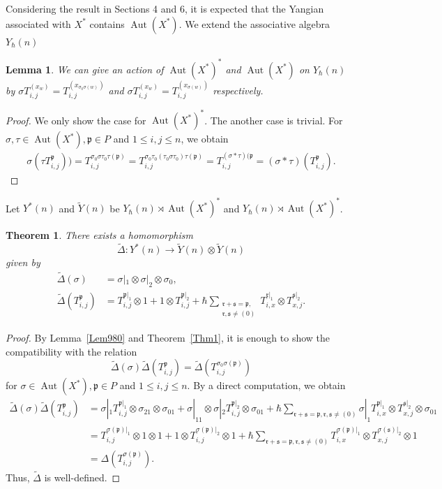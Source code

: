 \documentclass{article}
\newtheorem{Theorem}[equation]{Theorem}
\newtheorem{Lemma}[equation]{Lemma}
\theoremstyle{definition}
\theoremstyle{remark}
\numberwithin{equation}{section}
\DeclareMathOperator{\Aut}{Aut}
\numberwithin{equation}{section}
\begin{document}
Considering the result in Sections 4 and 6, it is expected that the Yangian associated with $X^*$ contains $\Aut(X^*)$. We extend the associative algebra $Y_\hbar(n)$
\begin{Lemma}
We can give an action of $\Aut(X^*)^\ast$ and $\Aut(X^*)$ on $Y_\hbar(n)$ by $\sigma T^{(x_w)}_{i,j}=T^{(x_{\sigma_0\sigma(w)})}_{i,j}$ and $\sigma T^{(x_w)}_{i,j}=T^{(x_{\sigma(w)})}_{i,j}$ respectively.
\end{Lemma}
\begin{proof}
We only show the case for $\Aut(X^*)^\ast$. The another case is trivial. For $\sigma,\tau\in\Aut(X^*),\mathfrak{p}\in P$ and $1\leq i,j\leq n$, we obtain
\begin{align*}
\sigma(\tau T^{\mathfrak{p}}_{i,j}))=T^{\sigma_0\sigma\tau_0\tau(\mathfrak{p})}_{i,j}=T^{\sigma_0\tau_0(\tau_0\sigma\tau_0)\tau(\mathfrak{p})}_{i,j}=T^{(\sigma\ast\tau)(\mathfrak{p}}_{i,j}=(\sigma\ast\tau)(T^{\mathfrak{p}}_{i,j}).
\end{align*}
\end{proof}
Let $Y^\ast(n)$ and $\widetilde{Y}(n)$ be $Y_\hbar(n)\rtimes\Aut(X^*)^*$ and $Y_\hbar(n)\rtimes\Aut(X^*)^\ast$.
\begin{Theorem}
There exists a homomorphism 
\[\widetilde{\Delta}\colon Y^\ast(n)\to \widetilde{Y}(n)\otimes \widetilde{Y}(n)\]
given by
\begin{align*}
\widetilde{\Delta}(\sigma)&=\sigma|_1\otimes\sigma|_2\otimes\sigma_0,\\
\widetilde{\Delta}(T^{\mathfrak{p}}_{i,j})&=T^{\mathfrak{p}|_1}_{i,j}\otimes1+1\otimes T^{\mathfrak{p}|_2}_{i,j}+\hbar\sum_{\substack{\mathfrak{r}+\mathfrak{s}=\mathfrak{p},\\\mathfrak{r},\mathfrak{s}\neq(0)}}T^{\mathfrak{r}|_1}_{i,x}\otimes T^{\mathfrak{s}|_2}_{x,j}.
\end{align*}
\end{Theorem}
\begin{proof}
By Lemma~\ref{Lem980} and Theorem~\ref{Thm1}, it is enough to show the compatibility with the relation
\[
\widetilde{\Delta}(\sigma)\widetilde{\Delta}(T^{\mathfrak{p}}_{i,j})=\widetilde{\Delta}(T^{\sigma_0\sigma(\mathfrak{p})}_{i,j})
\]
for $\sigma\in\Aut(X^*),\mathfrak{p}\in P$ and $1\leq i,j\leq n$. By a direct computation, we obtain
\begin{align*}
\widetilde{\Delta}(\sigma)\widetilde{\Delta}(T^{\mathfrak{p}}_{i,j})
&=\sigma|_1T^{\mathfrak{p}|_1}_{i,j}\otimes\sigma_21\otimes\sigma_01+\sigma|_11\otimes \sigma|_2T^{\mathfrak{p}|_2}_{i,j}\otimes\sigma_01+\hbar\sum_{\mathfrak{r}+\mathfrak{s}=\mathfrak{p},\mathfrak{r},\mathfrak{s}\neq(0)}\sigma|_1T^{\mathfrak{p}|_1}_{i,x}\otimes T^{\mathfrak{s}|_2}_{x,j}\otimes\sigma_01\\
&=T^{\sigma(\mathfrak{p})|_1}_{i,j}\otimes1\otimes1+1\otimes T^{\sigma(\mathfrak{p})|_2}_{i,j}\otimes1+\hbar\sum_{\mathfrak{r}+\mathfrak{s}=\mathfrak{p},\mathfrak{r},\mathfrak{s}\neq(0)}T^{\sigma(\mathfrak{p})|_1}_{i,x}\otimes T^{\sigma(\mathfrak{s})|_2}_{x,j}\otimes1\\
&=\Delta(T^{\sigma(\mathfrak{p})}_{i,j}).
\end{align*}
Thus, $\widetilde{\Delta}$ is well-defined.
\end{proof}
\end{document}
